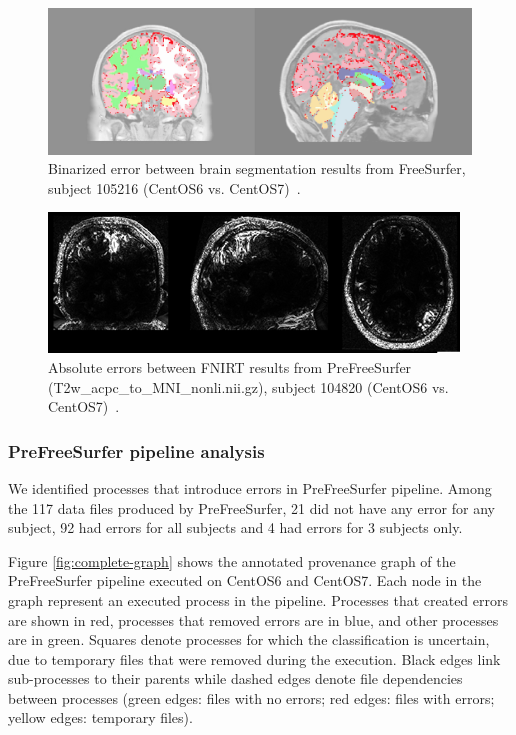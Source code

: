 \documentclass[a4paper,num-refs]{oup-contemporary}
\begin{document}
\begin{figure}
\centering
  \includegraphics[width=\columnwidth]{images/brain_classification.png} 
  \caption{Binarized error between brain segmentation results from 
  FreeSurfer, subject 105216 (CentOS6 vs. CentOS7)~\cite{Scaria2017}.
    } 
  \label{fig:tissue_class}
\end{figure}

\begin{figure}
\centering
  \includegraphics[width=\columnwidth]{images/fnirt_result.png} 
  \caption{Absolute errors between FNIRT results from PreFreeSurfer 
  (T2w\_acpc\_to\_MNI\_nonli.nii.gz), subject 104820 (CentOS6 vs. 
  CentOS7)~\cite{Scaria2017}. } 
  \label{fig:fnirt_result}
\end{figure}

\subsubsection{PreFreeSurfer pipeline analysis} 

We identified processes that introduce errors in PreFreeSurfer 
pipeline. Among the 117 data files produced by PreFreeSurfer, 21 did 
not have any error for any subject, 92 had errors for all subjects and 
4 had errors for 3 subjects only. 

Figure \ref{fig:complete-graph} shows the annotated provenance graph 
of the PreFreeSurfer pipeline executed on CentOS6 and CentOS7. Each 
node in the graph represent an executed process in the pipeline. 
Processes that created errors are shown in red, processes that removed 
errors are in blue, and other processes are in green.  Squares denote 
processes for which the classification is uncertain, due to temporary 
files that were removed during the execution. Black edges link 
sub-processes to their parents while dashed edges denote file 
dependencies between processes (green edges: files with no errors; red 
edges: files with errors; yellow edges: temporary files).
\end{document}
